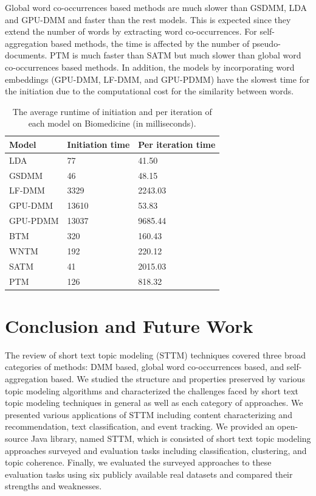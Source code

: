 \documentclass[10pt,journal,compsoc]{IEEEtran}
\begin{document}
{Global word co-occurrences based methods are much slower than GSDMM, LDA and GPU-DMM and faster than the rest models. This is expected since they extend the number of words by extracting word co-occurrences. For self-aggregation based methods, the time is affected by the number of pseudo-documents. PTM is much faster than SATM but much slower than global word co-occurrences based methods. In addition, the models by incorporating word embeddings (GPU-DMM, LF-DMM, and GPU-PDMM) have the slowest time for the initiation due to the computational cost for the similarity between words. 

\begin{table}[H]
  \centering
  \caption{The average runtime of initiation and per iteration of each model on Biomedicine (in milliseconds).} \label{time}
  \begin{tabular}{|l|l|l|}
    \hline
     {Model}&{Initiation time}&{Per iteration time}\\
     \hline
     {LDA}&77&41.50\\
     \hline
     {GSDMM}&46&48.15\\
     \hline
     {LF-DMM}&3329&2243.03\\
     \hline
     {GPU-DMM}&13610&53.83\\
     \hline
     {GPU-PDMM}&13037&9685.44\\
     \hline
     {BTM}&320&160.43\\
     \hline
     {WNTM}&192&220.12\\
     \hline
     {SATM}&41&2015.03\\
     \hline
     {PTM}&126&818.32\\
    \hline
  \end{tabular}
  
\end{table}

\section{Conclusion and Future Work}

The review of short text topic modeling (STTM) techniques covered three broad categories of methods: DMM based, global word co-occurrences based, and self-aggregation based. We studied the structure and properties preserved by various topic modeling algorithms and characterized the challenges faced by short text topic modeling techniques in general as well as each category of approaches. We presented various applications of STTM including content characterizing and recommendation, text classification, and event tracking. We provided an open-source Java library, named STTM, which is consisted of short text topic modeling approaches surveyed and evaluation tasks including classification, clustering, and topic coherence. Finally, we evaluated the surveyed approaches to these evaluation tasks using six publicly available real datasets and compared their strengths and weaknesses. 

}
\end{document}
